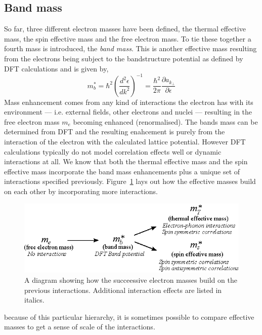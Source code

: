 \subsection{Band mass}

So far, three different electron masses have been defined, the thermal effective mass, the spin effective mass and the free electron mass. To tie these together a fourth mass is introduced, the \textit{band mass}. This is another effective mass resulting from the electrons being subject to the bandstructure potential as defined by \ac{DFT} calculations and is given by,
\begin{equation}
  m^*_b = \hbar^2 \left(\frac{d^2\epsilon}{dk^2}\right)^{-1} = \frac{\hbar^2}{2\pi}\frac{\partial a_{k_\perp}}{\partial \epsilon}
\end{equation}
Mass enhancement comes from any kind of interactions the electron has with its environment --- i.e. external fields, other electrons and nuclei --- resulting in the free electron mass $m_e$ becoming enhanced (renormalised). The bands mass can be determined from \ac{DFT} and the resulting enahcement is purely from the interaction of the electron with the calculated lattice potential. However \ac{DFT} calculations typically do not model correlation effects well or dynamic interactions at all. We know that both the thermal effective mass and the spin effective mass incorporate the band mass enhancements plus a unique set of interactions specified previously. Figure~\ref{Fig:Theo:EffectiveMassInheritance} lays out how the effective masses build on each other by incorporating more interactions.
\begin{figure}[htbp]
    \begin{center}
        \includegraphics[scale=0.9]{Chapter-Theory/Figures/EffectiveMassInheritance/EffectiveMassInheritance}
        \caption{A diagram showing how the succeessive electron masses build on the previous interactions. Additional interaction effects are listed in italics.}
        \label{Fig:Theo:EffectiveMassInheritance}
    \end{center}
\end{figure}
because of this particular hierarchy, it is sometimes possible to compare effective masses to get a sense of scale of the interactions.

